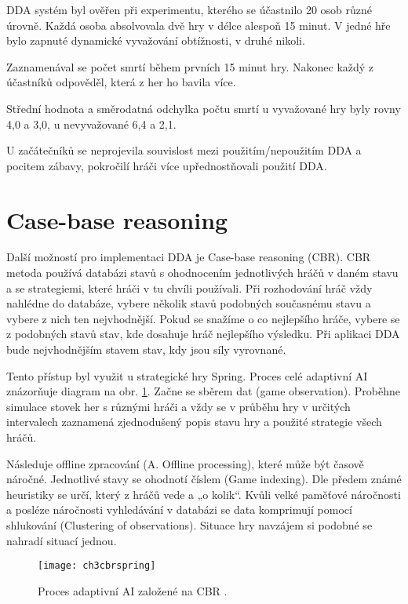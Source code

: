 DDA systém byl ověřen při experimentu, kterého se účastnilo 20 osob různé úrovně. Každá osoba absolvovala dvě hry v délce alespoň 15 minut. V jedné hře bylo zapnuté dynamické vyvažování obtížnosti, v druhé nikoli.

Zaznamenával se počet smrtí během prvních 15 minut hry. Nakonec každý z účastníků odpověděl, která z her ho bavila více.

Střední hodnota a směrodatná odchylka počtu smrtí u vyvažované hry byly rovny 4,0 a 3,0, u nevyvažované 6,4 a 2,1.

U začátečníků se neprojevila souvislost mezi použitím/nepoužitím DDA a pocitem zábavy, pokročilí hráči více upřednostňovali použití DDA.

\section{Case-base reasoning} \label{sec:CBR}

Další možností pro implementaci DDA je Case-base reasoning (CBR). CBR metoda používá databázi stavů s ohodnocením jednotlivých hráčů v daném stavu a se strategiemi, které hráči v tu chvíli používali. Při rozhodování hráč vždy nahlédne do databáze, vybere několik stavů podobných současnému stavu a vybere z nich ten nejvhodnější. Pokud se snažíme o co nejlepšího hráče, vybere se z podobných stavů stav, kde dosahuje hráč nejlepšího výsledku. Při aplikaci DDA bude nejvhodnějším stavem stav, kdy jsou síly vyrovnané.

Tento přístup byl využit u strategické hry Spring\cite{21cbr}. Proces celé adaptivní AI znázorňuje diagram na obr. \ref{fig:ch3cbrspring}.
Začne se sběrem dat (game observation). Proběhne simulace stovek her s různými hráči a vždy se v průběhu hry v určitých intervalech zaznamená zjednodušený popis stavu hry a použité strategie všech hráčů. 

Následuje offline zpracování (A. Offline processing), které může být časově náročné. Jednotlivé stavy se ohodnotí číslem (Game indexing). Dle předem známé heuristiky se určí, který z hráčů vede a „o kolik“. Kvůli velké paměťové náročnosti a posléze náročnosti vyhledávání v databázi se data komprimují pomocí shlukování (Clustering of observations). Situace hry navzájem si podobné se nahradí situací jednou.
 
\begin{figure}
  \centering
  \texttt{[image: ch3cbrspring]}
	\caption{Proces adaptivní AI založené na CBR \cite{21cbr}.}
	\label{fig:ch3cbrspring}
\end{figure}

